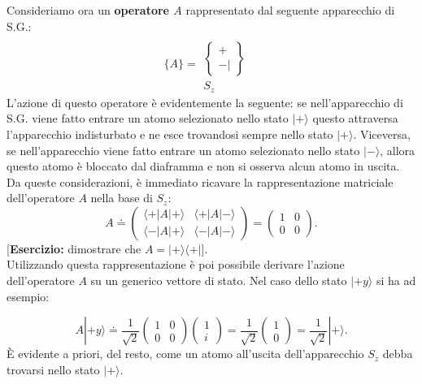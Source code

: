 \documentclass[a4paper,12pt,oneside]{book}
\begin{document}
Consideriamo ora un \textbf{operatore $A$} rappresentato dal seguente apparecchio di S.G.:
	\begin{equation}
		\bigg\lbrace A\bigg\rbrace =
		\begin{matrix}
		\
		\\[0.25cm]
		\begin{Bmatrix}
		 +  \\ - |  
		\end{Bmatrix} \\[0.5cm]
		S_z&
		\end{matrix}
	\end{equation}
L'azione di questo operatore è evidentemente la seguente:
se nell'apparecchio di S.G. viene fatto entrare un atomo selezionato nello stato $| + \rangle$ questo attraversa l'apparecchio indisturbato e ne esce trovandosi sempre nello stato $| + \rangle $. Viceversa, se nell'apparecchio viene fatto entrare un atomo selezionato nello stato $| - \rangle $, allora questo atomo è bloccato dal diaframma e non si osserva alcun atomo in uscita. Da queste considerazioni, è immediato ricavare la rappresentazione matriciale dell'operatore $A$ nella base di $S_z$:
	\begin{equation}
		\boxed{
			A \doteq 
			\begin{pmatrix}
			\langle + | A | + \rangle & \langle + | A | - \rangle \\
			\langle - | A | + \rangle & \langle - | A | - \rangle
			\end{pmatrix}=
			\begin{pmatrix}
			1 & 0\\
			0 & 0
			\end{pmatrix} .
			}
\end{equation}
[\textbf{Esercizio:}
dimostrare  che $A= | + \rangle \langle + | $].\\

Utilizzando questa rappresentazione è poi possibile derivare l'azione dell'operatore $A$ su un generico vettore di stato. Nel caso dello stato $| +y \rangle $ si ha ad esempio:

	\begin{equation}
		A | +y \rangle \doteq \frac{1}{\sqrt{2}}
		\begin{pmatrix}
		1 & 0\\
		0 & 0
		\end{pmatrix}
		\begin{pmatrix}
		1\\
		i
		\end{pmatrix}=
		\frac{1}{\sqrt{2}}\begin{pmatrix}
		1\\
		0
		\end{pmatrix}=
		\frac{1}{\sqrt{2}}| + \rangle .
	\end{equation}
È evidente a priori, del resto, come un atomo all'uscita dell'apparecchio $S_z$ debba trovarsi nello stato $| + \rangle $.
\end{document}
